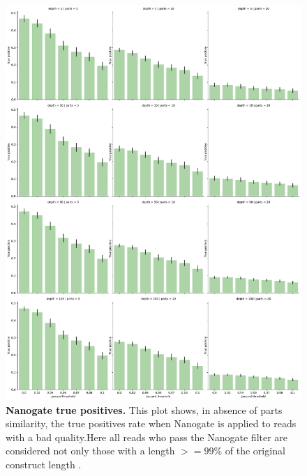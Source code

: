 \documentclass[11pt, a4paper]{article}
\begin{document}
 \begin{figure}[ht]
    \begin{center}
    \includegraphics[width=1.35\textwidth]{../results/images_notebook/v_450/sim_00_true_positive.pdf}
    \end{center}
    \caption{{\bf Nanogate true positives.}  This plot shows, in absence of parts similarity, the true positives rate when Nanogate is applied to reads with a bad quality.Here all reads who pass the Nanogate filter are considered not only those with a length $>= 99\%$ of the original construct length . }
   \label{fig:v_450_sim_00_true_positives}
\end{figure}
\end{document}
